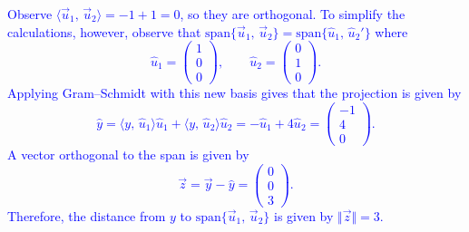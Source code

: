 \documentclass[a4paper,11pt]{article}
\newcommand{\blue}[1]{\textcolor{blue}{#1}}
\begin{document}
\blue{Observe $\langle \vec u_1,\,\vec u_2 \rangle=-1+1=0$, so they are
  orthogonal. To simplify the calculations, however, observe that
  $\text{span}\{\vec u_1,\,\vec u_2\} = \text{span}\{\hat u_1,\,\hat u_2'\}$
  where
  \[
    \hat u_1 =
    \left(
      \begin{array}{r}
        1 \\ 0 \\ 0
      \end{array}
    \right), \qquad
    \hat u_2 =
    \left(
      \begin{array}{r}
        0 \\ 1 \\ 0
      \end{array}
    \right).
  \]
  Applying Gram--Schmidt with this new basis gives that the projection is given
  by
  \[
    \hat y = \langle y,\,\hat u_1 \rangle\hat u_1 + \langle y,\,\hat u_2
    \rangle\hat u_2 = -\hat u_1 + 4\hat u_2 =
    \left(
      \begin{array}{r}
        -1\\4\\0
      \end{array}
    \right).
  \]
  A vector orthogonal to the span is given by
  \[
    \vec z = \vec y-\hat y =
    \left(
      \begin{array}{r}
        0\\0\\3
      \end{array}
    \right).
  \]
  Therefore, the distance from $y$ to $\text{span}\{\vec u_1,\,\vec u_2\}$ is
  given by $\Vert \vec z \Vert = 3$. \\}
\end{document}
